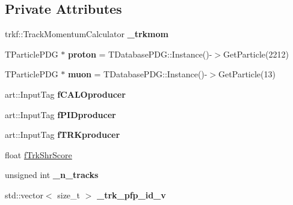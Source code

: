 \subsection*{Private Attributes}
\begin{DoxyCompactItemize}
\item 
\hypertarget{classanalysis_1_1TrackAnalysis_aa69136b70c77e0f034fe009b86ba591b}{trkf\-::\-Track\-Momentum\-Calculator {\bfseries \-\_\-trkmom}}\label{classanalysis_1_1TrackAnalysis_aa69136b70c77e0f034fe009b86ba591b}

\item 
\hypertarget{classanalysis_1_1TrackAnalysis_a4adc7f89c334ab93747a8d4c4abbcc6d}{T\-Particle\-P\-D\-G $\ast$ {\bfseries proton} = T\-Database\-P\-D\-G\-::\-Instance()-\/$>$Get\-Particle(2212)}\label{classanalysis_1_1TrackAnalysis_a4adc7f89c334ab93747a8d4c4abbcc6d}

\item 
\hypertarget{classanalysis_1_1TrackAnalysis_a0fe3b9e7864aaaa36b5f52826b4e3eb9}{T\-Particle\-P\-D\-G $\ast$ {\bfseries muon} = T\-Database\-P\-D\-G\-::\-Instance()-\/$>$Get\-Particle(13)}\label{classanalysis_1_1TrackAnalysis_a0fe3b9e7864aaaa36b5f52826b4e3eb9}

\item 
\hypertarget{classanalysis_1_1TrackAnalysis_a0ceaf940b041eda0237cc73cd330d18d}{art\-::\-Input\-Tag {\bfseries f\-C\-A\-L\-Oproducer}}\label{classanalysis_1_1TrackAnalysis_a0ceaf940b041eda0237cc73cd330d18d}

\item 
\hypertarget{classanalysis_1_1TrackAnalysis_a349dc117e508190c619cd9f47ea7647e}{art\-::\-Input\-Tag {\bfseries f\-P\-I\-Dproducer}}\label{classanalysis_1_1TrackAnalysis_a349dc117e508190c619cd9f47ea7647e}

\item 
\hypertarget{classanalysis_1_1TrackAnalysis_a45abdcf3140e68a2ce90501e33a00eb3}{art\-::\-Input\-Tag {\bfseries f\-T\-R\-Kproducer}}\label{classanalysis_1_1TrackAnalysis_a45abdcf3140e68a2ce90501e33a00eb3}

\item 
float \hyperlink{classanalysis_1_1TrackAnalysis_a49502213574f13be542aaab647940ffd}{f\-Trk\-Shr\-Score}
\item 
\hypertarget{classanalysis_1_1TrackAnalysis_a965f2969aac19332af4597a364586c5d}{unsigned int {\bfseries \-\_\-n\-\_\-tracks}}\label{classanalysis_1_1TrackAnalysis_a965f2969aac19332af4597a364586c5d}

\item 
\hypertarget{classanalysis_1_1TrackAnalysis_a204ef1a35c4346e36ffba8ced3c6ce5c}{std\-::vector$<$ size\-\_\-t $>$ {\bfseries \-\_\-trk\-\_\-pfp\-\_\-id\-\_\-v}}\label{classanalysis_1_1TrackAnalysis_a204ef1a35c4346e36ffba8ced3c6ce5c}


\end{DoxyCompactItemize}
